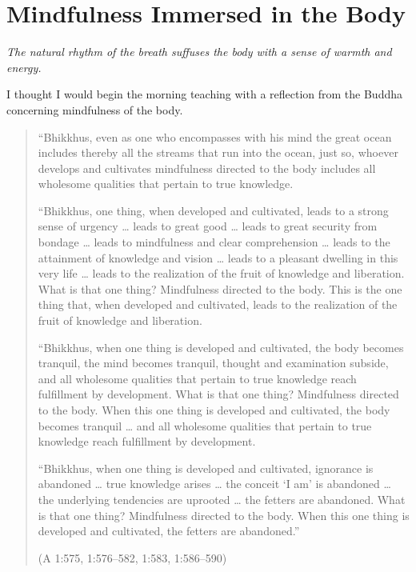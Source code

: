 \chapter{Mindfulness Immersed in the
Body}

\epigraph{\emph{The natural rhythm of the breath suffuses the body with
a sense of warmth and energy.}}{}

I thought I would begin the morning teaching with a reflection from the
Buddha concerning mindfulness of the body.

\begin{quotation}
“Bhikkhus, even as one who encompasses with his mind the great ocean
includes thereby all the streams that run into the ocean, just so,
whoever develops and cultivates mindfulness directed to the body
includes all wholesome qualities that pertain to true knowledge.

“Bhikkhus, one thing, when developed and cultivated, leads to a strong
sense of urgency \ldots{} leads to great good \ldots{} leads to great security
from bondage \ldots{} leads to mindfulness and clear comprehension \ldots{} leads
to the attainment of knowledge and vision \ldots{} leads to a pleasant
dwelling in this very life \ldots{} leads to the realization of the fruit of
knowledge and liberation. What is that one thing? Mindfulness directed
to the body. This is the one thing that, when developed and cultivated,
leads to the realization of the fruit of knowledge and liberation.

“Bhikkhus, when one thing is developed and cultivated, the body becomes
tranquil, the mind becomes tranquil, thought and examination subside,
and all wholesome qualities that pertain to true knowledge reach
fulfillment by development. What is that one thing? Mindfulness directed
to the body. When this one thing is developed and cultivated, the body
becomes tranquil \ldots{} and all wholesome qualities that pertain to true
knowledge reach fulfillment by development.

“Bhikkhus, when one thing is developed and cultivated, ignorance is
abandoned \ldots{} true knowledge arises \ldots{} the conceit ‘I am’ is abandoned
\ldots{} the underlying tendencies are uprooted \ldots{} the fetters are
abandoned. What is that one thing? Mindfulness directed to the body.
When this one thing is developed and cultivated, the fetters are
abandoned.”

\hfill(A 1:575, 1:576–582, 1:583, 1:586–590)
\end{quotation}

